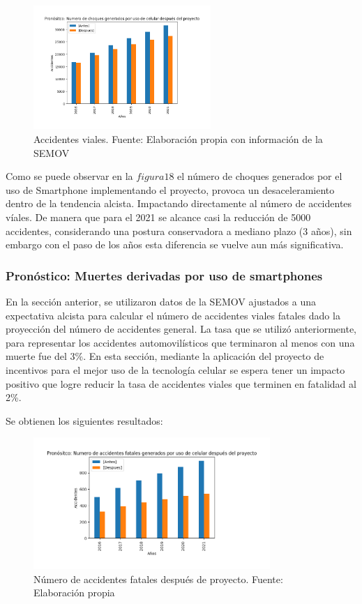 \documentclass{article}
\begin{document}
	\begin{figure}[H]\centering
	\includegraphics[width=0.6\textwidth]{resources/img/smart_accidents_after.png}
	\caption{\label{fig:smart_accidents_after} Accidentes viales. Fuente: Elaboración propia con información de la SEMOV}
    \end{figure}
Como se puede observar en la $figura 18$ el número de choques generados por el uso de Smartphone implementando el proyecto, provoca un desaceleramiento dentro de la tendencia alcista. Impactando directamente al número de accidentes víales. De manera que para el 2021 se alcance casi la reducción de 5000 accidentes, considerando una postura conservadora a mediano plazo (3 años), sin embargo con el paso de los años esta diferencia se vuelve aun más significativa. 

\subsubsection{Pronóstico: Muertes derivadas por uso de smartphones}

En la sección anterior, se utilizaron datos de la SEMOV ajustados a una expectativa alcista para calcular el número 
de accidentes viales fatales dado la proyección del número de accidentes general. La tasa que se utilizó anteriormente, para representar los accidentes automovilísticos que terminaron al menos con una muerte 
fue del 3\%. En esta sección, mediante la aplicación del proyecto de incentivos para el mejor uso de la tecnología celular se espera tener un impacto positivo que logre reducir la tasa de accidentes viales que terminen en fatalidad al 2\%.

Se obtienen los siguientes resultados:

	\begin{figure}[H]\centering
	\includegraphics[width=0.8\textwidth]{resources/img/smart_fatal_accidents_after.png}
	\caption{\label{fig:prono_accidentes_fatales_after} Número de accidentes fatales después de proyecto. Fuente: Elaboración propia}
    \end{figure}
    
\end{document}
